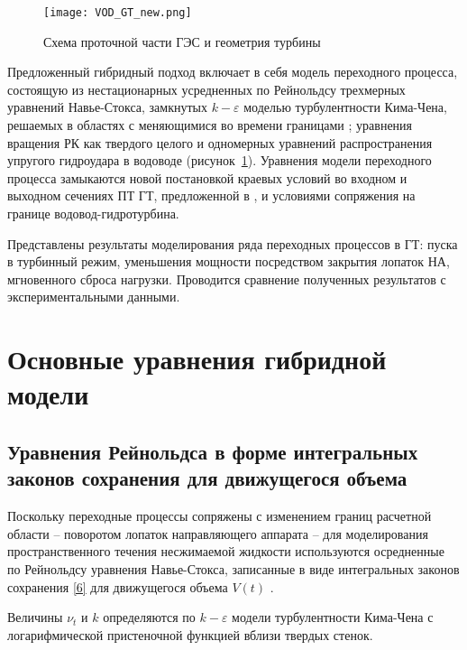 \begin{figure}[h]
  \centering
  \texttt{[image: VOD\_GT\_new.png]}
  \caption{Схема проточной части ГЭС и геометрия турбины}
  \label{fig2:1}
\end{figure}

Предложенный гибридный подход включает в себя модель переходного процесса, 
состоящую из нестационарных усредненных по Рейнольдсу трехмерных уравнений Навье-Стокса, 
замкнутых $k-\varepsilon $ моделью турбулентности Кима-Чена, 
решаемых в областях с меняющимися во времени границами \cite{my1}; уравнения вращения РК как твердого целого и 
одномерных уравнений распространения упругого гидроудара в водоводе (рисунок~\ref{fig2:1}). 
Уравнения модели переходного процесса 
замыкаются новой постановкой краевых условий во входном и выходном сечениях ПТ ГТ, предложенной в 
\cite{bannikov}, и условиями сопряжения на границе водовод-гидротурбина.

Представлены результаты моделирования ряда переходных процессов в ГТ: пуска в турбинный режим, уменьшения 
мощности посредством закрытия лопаток НА, мгновенного сброса нагрузки. Проводится сравнение полученных 
результатов с экспериментальными данными.

\section{Основные уравнения гибридной модели}
\label{s:21}
\subsection{Уравнения Рейнольдса в форме интегральных законов сохранения для движущегося объема} Поскольку 
переходные процессы сопряжены с изменением границ расчетной области -- поворотом лопаток направляющего 
аппарата -- для моделирования пространственного течения несжимаемой жидкости используются
осредненные по Рейнольдсу уравнения Навье-Стокса, записанные в виде интегральных законов сохранения \eqref{6} 
для движущегося объема $V(t)$ \cite{my1}.

Величины $\nu_t$ и $k$ определяются по  $k-\varepsilon$ модели турбулентности Кима-Чена \cite{kimchen} с 
логарифмической пристеночной функцией вблизи твердых стенок.

